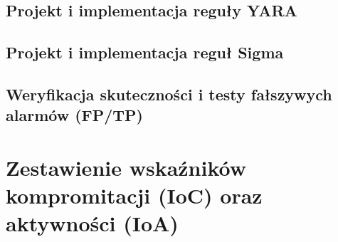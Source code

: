 \subsection{Projekt i implementacja reguły YARA}\label{subsec:cs1_regula_yara}

\subsection{Projekt i implementacja reguł Sigma}\label{subsec:cs1_regula_sigma}

\subsection{Weryfikacja skuteczności i testy fałszywych alarmów (FP/TP)}\label{subsec:cs1_walidacja}

\section{Zestawienie wskaźników kompromitacji (IoC) oraz aktywności (IoA)}\label{sec:cs1_ioc_ioa}

